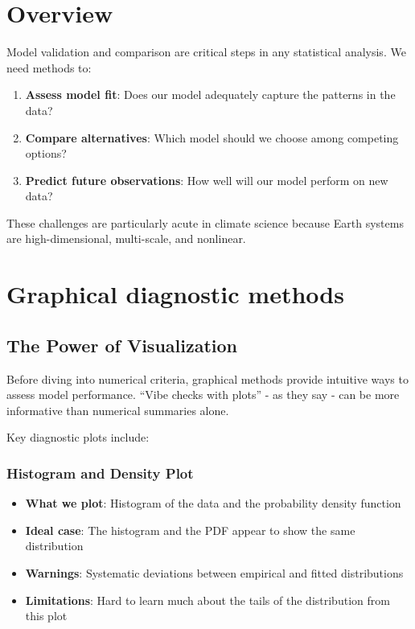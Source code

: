 \documentclass[
  letterpaper,
  DIV=11,
  numbers=noendperiod]{scrreprt}
\providecommand{\tightlist}{%
  \setlength{\itemsep}{0pt}\setlength{\parskip}{0pt}}
\begin{document}
\section{Overview}\label{overview-2}

Model validation and comparison are critical steps in any statistical
analysis. We need methods to:

\begin{enumerate}
\def\labelenumi{\arabic{enumi}.}
\tightlist
\item
  \textbf{Assess model fit}: Does our model adequately capture the
  patterns in the data?
\item
  \textbf{Compare alternatives}: Which model should we choose among
  competing options?
\item
  \textbf{Predict future observations}: How well will our model perform
  on new data?
\end{enumerate}

These challenges are particularly acute in climate science because Earth
systems are high-dimensional, multi-scale, and nonlinear.

\section{Graphical diagnostic
methods}\label{graphical-diagnostic-methods}

\subsection{The Power of
Visualization}\label{the-power-of-visualization}

Before diving into numerical criteria, graphical methods provide
intuitive ways to assess model performance. ``Vibe checks with plots'' -
as they say - can be more informative than numerical summaries alone.

Key diagnostic plots include:

\subsubsection{Histogram and Density
Plot}\label{histogram-and-density-plot}

\begin{itemize}
\tightlist
\item
  \textbf{What we plot}: Histogram of the data and the probability
  density function
\item
  \textbf{Ideal case}: The histogram and the PDF appear to show the same
  distribution
\item
  \textbf{Warnings}: Systematic deviations between empirical and fitted
  distributions
\item
  \textbf{Limitations}: Hard to learn much about the tails of the
  distribution from this plot
\end{itemize}
\end{document}
